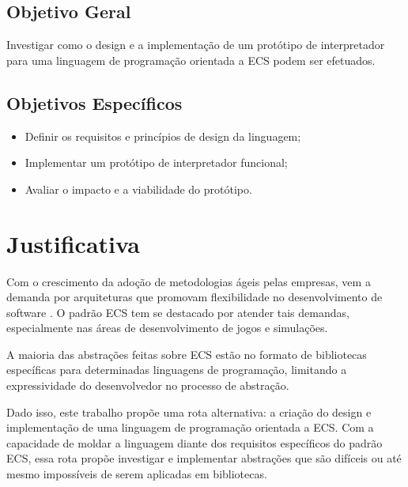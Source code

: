 \subsection{Objetivo Geral}

Investigar como o design e a implementação de um protótipo de interpretador para uma linguagem de programação orientada a ECS podem ser efetuados.

\subsection{Objetivos Específicos}

\begin{itemize}
    \item Definir os requisitos e princípios de design da linguagem;
    \item Implementar um protótipo de interpretador funcional;
    \item Avaliar o impacto e a viabilidade do protótipo.
\end{itemize}

\section{Justificativa}

Com o crescimento da adoção de metodologias ágeis pelas empresas, vem a demanda por arquiteturas que promovam flexibilidade no desenvolvimento de software \cite{flightdynamics}. O padrão ECS tem se destacado por atender tais demandas, especialmente nas áreas de desenvolvimento de jogos e simulações.

A maioria das abstrações feitas sobre ECS estão no formato de bibliotecas específicas para determinadas linguagens de programação, limitando a expressividade do desenvolvedor no processo de abstração.

Dado isso, este trabalho propõe uma rota alternativa: a criação do design e implementação de uma linguagem de programação orientada a ECS. Com a capacidade de moldar a linguagem diante dos requisitos específicos do padrão ECS, essa rota propõe investigar e implementar abstrações que são difíceis ou até mesmo impossíveis de serem aplicadas em bibliotecas.
